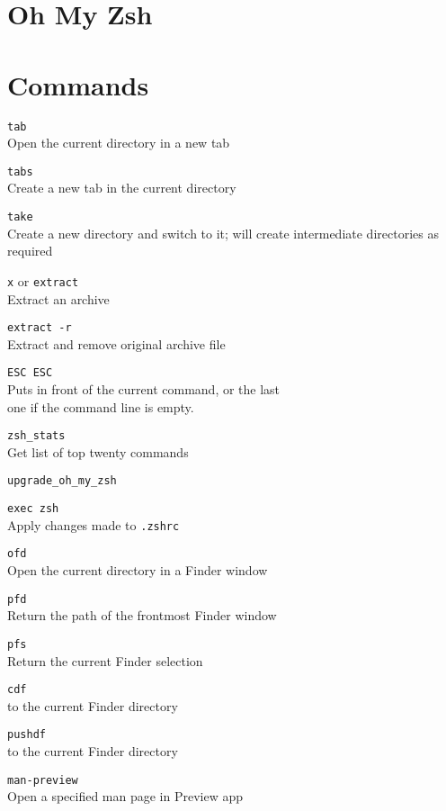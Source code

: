 \documentclass[a4paper,landscape,columns=3]{cheatsheet}
\newcommand{\code}{\texttt}
\newcommand{\codequiv}{\dsm}
\begin{document}
\sffamily

\section{Oh My Zsh}

\bigskip

\section{Commands}

\code{tab}\\
Open the current directory in a new tab

\code{tabs}\\
Create a new tab in the current directory

\code{take}\\
Create a new directory and switch to it; will create intermediate directories as required

\code{x} or \code{extract}\\
Extract an archive

\code{extract -r}\\
Extract and remove original archive file

\code{ESC ESC}\\
Puts {\codequiv{sudo}} in front of the current command, or the last\\ one if the command line is empty.

\code{zsh\_stats}\\
Get list of top twenty commands

\code{upgrade\_oh\_my\_zsh}

\code{exec zsh}\\
Apply changes made to \code{.zshrc}

\code{ofd}\\
 Open the current directory in a Finder window

\code{pfd}\\
 Return the path of the frontmost Finder window

\code{pfs}\\
 Return the current Finder selection

\code{cdf }\\
{\codequiv{cd}} to the current Finder directory

\code{pushdf}\\
{\codequiv{pushd}} to the current Finder directory

\code{man-preview}\\
 Open a specified man page in Preview app
\end{document}
